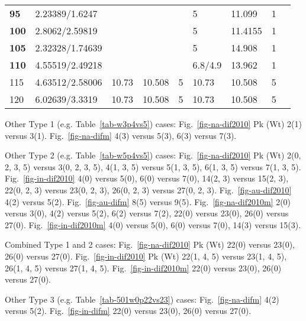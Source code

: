 \begin{table}[!ht]
{\begin{tabular}{@{}llllllllll@{}}
      \textbf{95} & 2.23389/1.6247 & \multicolumn{3}{l}{} & 5 & 11.099 & 1 & \multicolumn{2}{l}{} \\
      \textbf{100} & 2.8062/2.59819 & \multicolumn{3}{l}{} & 5 & 11.4155 & 1 & \multicolumn{2}{l}{} \\
      \textbf{105} & 2.32328/1.74639 & \multicolumn{3}{l}{} & 5 & 14.908 & 1 & \multicolumn{2}{l}{} \\
      \textbf{110} & 4.55519/2.49218 & \multicolumn{3}{l}{} & 6.8/4.9 & 13.962 & 1 & \multicolumn{2}{l}{} \\
      115 & 4.63512/2.58006 & 10.73 & 10.508 & 5 & 10.73 & 10.508 & 5 & \multicolumn{2}{l}{} \\
      120 & 6.02639/3.3319 & 10.73 & 10.508 & 5 & 10.73 & 10.508 & 5 & \multicolumn{2}{l}{} \\ \cmidrule(r){1-8}
    \end{tabular}%
  }
\end{table}

Other Type 1 (e.g. Table~\ref{tab-w3p4vs5}) cases: Fig.~\ref{fig-na-dif2010} Pk
(Wt) 2(1) versus 3(1). Fig.~\ref{fig-na-difm} 4(3) versus 5(3), 6(3) versus
7(3).

Other Type 2 (e.g. Table~\ref{tab-w5p4vs5}) cases: Fig.~\ref{fig-na-dif2010} Pk
(Wt) 2(0, 2, 3, 5) versus 3(0, 2, 3, 5), 4(1, 3, 5) versus 5(1, 3, 5), 6(1, 3,
5) versus 7(1, 3, 5). Fig.~\ref{fig-in-dif2010} 4(0) versus
5(0), 6(0) versus 7(0), 14(2, 3) versus
15(2, 3), 22(0, 2, 3) versus 23(0, 2, 3), 26(0, 2, 3) versus 27(0, 2, 3).
Fig.~\ref{fig-au-dif2010} 4(2) versus 5(2). Fig.~\ref{fig-au-difm} 8(5) versus
9(5). Fig.~\ref{fig-na-dif2010m} 2(0) versus 3(0), 4(2)
versus 5(2), 6(2) versus 7(2), 22(0) versus 23(0),
26(0) versus 27(0). Fig.~\ref{fig-in-dif2010m}
4(0) versus 5(0), 6(0) versus
7(0), 14(3) versus 15(3).

Combined Type 1 and 2 cases: Fig.~\ref{fig-na-dif2010} Pk (Wt) 22(0)
versus 23(0), 26(0) versus 27(0).
Fig.~\ref{fig-in-dif2010} Pk (Wt) 22(1, 4, 5) versus 23(1, 4, 5), 26(1, 4, 5)
versus 27(1, 4, 5). Fig.~\ref{fig-in-dif2010m} 22(0) versus
23(0), 26(0) versus 27(0).

Other Type 3 (e.g. Table~\ref{tab-501w0p22vs23}) cases: Fig.~\ref{fig-na-difm}
4(2) versus 5(2). Fig.~\ref{fig-in-difm}
22(0) versus 23(0), 26(0) versus
27(0).


